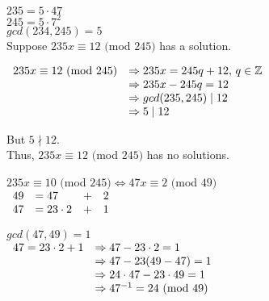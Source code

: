 \documentclass[a4paper, 11pt]{article}
\begin{document}
\begin{myEnumerate}
\begin{myEnumerate}
        \item
        $235 = 5 \cdot 47$ \\
        $245 = 5 \cdot 7^{2}$ \\
        $gcd(234, 245) = 5$ \\
        
        Suppose $235x \equiv 12 $ $ ($mod $ 245)$ has a solution.
        
        \( \\
        \begin{array}{ll}
        	235x \equiv 12 $ $ ($mod $ 245) & \Rightarrow 235x = 245q + 12, $ $q \in \mathbb{Z} \\
            								& \Rightarrow 235x - 245q = 12 \\
                                            & \Rightarrow gcd(235, 245) \mid 12 \\
                                            & \Rightarrow 5 \mid 12
        \end{array} \\ \)
        
        But $5 \nmid 12$. \\
        Thus, $235x \equiv 12 $ $ ($mod $ 245)$ has no solutions. \\
        
        \item
        $235x \equiv 10 $ $ ($mod $ 245) \Leftrightarrow 47x \equiv 2 $ $ ($mod $ 49)$ \\
        
        \(
        \begin{array}{llll}
        	49 & = 47 & + & 2 \\
            47 & = 23 \cdot 2 & + & 1
        \end{array} \\ \)
        
        $gcd(47, 49) = 1$ \\
        
        \(
        \begin{array}{ll}
        	47 = 23 \cdot 2 + 1 & \Rightarrow 47 - 23 \cdot 2 = 1 \\
            					& \Rightarrow 47 - 23(49 - 47) = 1 \\
                                & \Rightarrow 24 \cdot 47 - 23 \cdot 49 = 1 \\
                                & \Rightarrow 47^{-1} = 24 $ $ ($mod $ 49)
        \end{array} \\ \)
        

\end{myEnumerate}
\end{myEnumerate}
\end{document}
